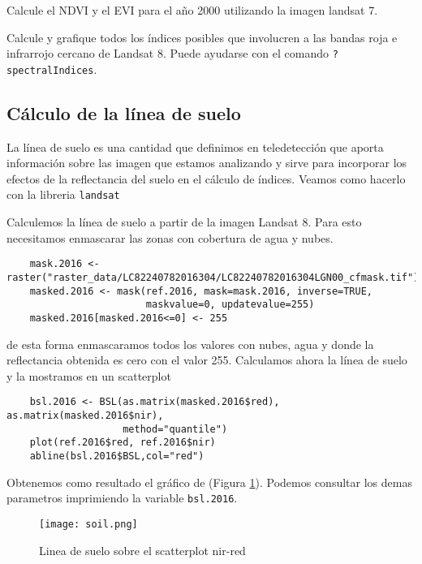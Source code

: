 \begin{act}
    Calcule el NDVI y el EVI para el año 2000 utilizando la imagen landsat 7.
\end{act}

\begin{act}
    Calcule y grafique todos los \'indices posibles que involucren a las bandas
    roja e infrarrojo cercano de Landsat 8. Puede ayudarse con el comando
    \texttt{?spectralIndices}.
\end{act}

\subsection{C\'alculo de la l\'inea de suelo}

La l\'inea de suelo es una cantidad que definimos en teledetecci\'on que aporta
informaci\'on sobre las imagen que estamos analizando y sirve para incorporar
los efectos de la reflectancia del suelo en el c\'alculo de \'indices.
Veamos como hacerlo con la libreria \texttt{landsat}

\begin{exa}
    Calculemos la l\'inea de suelo a partir de la imagen Landsat 8.
    Para esto necesitamos enmascarar las zonas con
    cobertura de agua y nubes.
    \begin{lstlisting}
    mask.2016 <- raster("raster_data/LC82240782016304/LC82240782016304LGN00_cfmask.tif")
    masked.2016 <- mask(ref.2016, mask=mask.2016, inverse=TRUE,
                        maskvalue=0, updatevalue=255)
    masked.2016[masked.2016<=0] <- 255
    \end{lstlisting}
    de esta forma enmascaramos todos los valores con nubes, agua y donde la
    reflectancia obtenida es cero con el valor 255.
    Calculamos ahora la l\'inea de suelo y la mostramos en un scatterplot
    \begin{lstlisting}
    bsl.2016 <- BSL(as.matrix(masked.2016$red), as.matrix(masked.2016$nir),
                    method="quantile")
    plot(ref.2016$red, ref.2016$nir)
    abline(bsl.2016$BSL,col="red")
    \end{lstlisting}
    Obtenemos como resultado el gr\'afico de (Figura \ref{fig:soil}). Podemos consultar
    los demas parametros imprimiendo la variable \texttt{bsl.2016}.
    \begin{figure}[h!]
    \begin{center}
        \texttt{[image: soil.png]}
    \end{center}
    \caption{Linea de suelo sobre el scatterplot nir-red}
    \label{fig:soil}
    \end{figure}

\end{exa}

